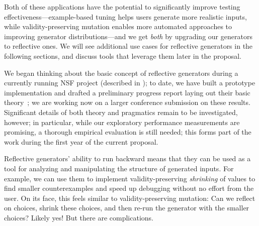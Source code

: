 Both of these applications have the potential to significantly improve
testing effectiveness---example-based tuning helps users generate more
realistic inputs, while validity-preserving mutation enables more
automated approaches to improving generator distributions---and we get
{\em both} by upgrading our generators to reflective ones. We
will see additional use cases for reflective generators in the
following sections, and discuss tools that leverage them later in the proposal.

\smallskip

We began thinking about the basic concept of reflective generators during a
currently running NSF project (described in );
to date, we have built a
prototype implementation and drafted a preliminary progress report
laying out their basic theory~\cite{Frohlich2022}; we are working now
on a larger conference submission on these results.  Significant details of
both theory and pragmatics remain to be investigated, however; in particular,
while our exploratory performance measurements are promising, a
thorough empirical evaluation is still needed; this forms part of the work during the first
year of the current proposal.


%
\iflater{}\fi
{}
Reflective generators' ability to run backward means that they can be used as
a tool for analyzing and manipulating the structure of
generated
inputs.  For example, we can use them to
implement validity-preserving {\em
shrinking} of values to find smaller counterexamples and speed up debugging
without no effort from the user. On its face, this feels similar to
validity-preserving mutation: Can we reflect on choices, shrink these
choices, and
then re-run the generator with the smaller choices? Likely yes! But there are
complications.

